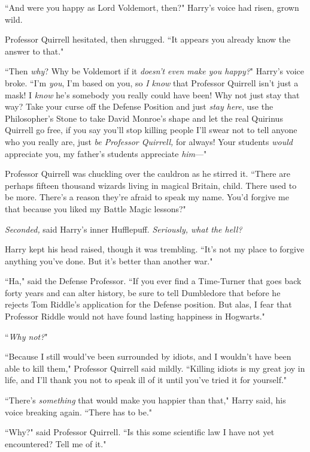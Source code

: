 ``And were you happy as Lord Voldemort, then?" Harry's voice had risen, grown wild.

Professor Quirrell hesitated, then shrugged. ``It appears you already know the answer to that."

``Then \emph{why}? Why be Voldemort if it \emph{doesn't even make you happy?}" Harry's voice broke. ``I'm \emph{you}, I'm based on you, so \emph{I know} that Professor Quirrell isn't just a mask! I \emph{know} he's somebody you really could have been! Why not just stay that way? Take your curse off the Defense Position and just \emph{stay here}, use the Philosopher's Stone to take David Monroe's shape and let the real Quirinus Quirrell go free, if you say you'll stop killing people I'll swear not to tell anyone who you really are, just \emph{be Professor Quirrell,} for always! Your students \emph{would} appreciate you, my father's students appreciate \emph{him}—"

Professor Quirrell was chuckling over the cauldron as he stirred it. ``There are perhaps fifteen thousand wizards living in magical Britain, child. There used to be more. There's a reason they're afraid to speak my name. You'd forgive me that because you liked my Battle Magic lessons?"

\emph{Seconded,} said Harry's inner Hufflepuff. \emph{Seriously, what the hell?}

Harry kept his head raised, though it was trembling. ``It's not my place to forgive anything you've done. But it's better than another war."

``Ha," said the Defense Professor. ``If you ever find a Time-Turner that goes back forty years and can alter history, be sure to tell Dumbledore that before he rejects Tom Riddle's application for the Defense position. But alas, I fear that Professor Riddle would not have found lasting happiness in Hogwarts."

``\emph{Why not?}"

``Because I still would've been surrounded by idiots, and I wouldn't have been able to kill them," Professor Quirrell said mildly. ``Killing idiots is my great joy in life, and I'll thank you not to speak ill of it until you've tried it for yourself."

``There's \emph{something} that would make you happier than that," Harry said, his voice breaking again. ``There has to be."

``Why?" said Professor Quirrell. ``Is this some scientific law I have not yet encountered? Tell me of it."

